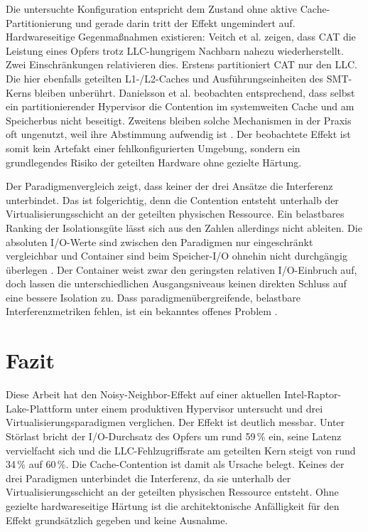 \documentclass[conference]{IEEEtran}
\begin{document}
Die untersuchte Konfiguration entspricht dem Zustand ohne aktive Cache-Partitionierung und gerade darin tritt der Effekt ungemindert auf. Hardwareseitige Gegenmaßnahmen existieren: Veitch et al. \cite{veitch2017performance} zeigen, dass CAT die Leistung eines Opfers trotz LLC-hungrigem Nachbarn nahezu wiederherstellt. Zwei Einschränkungen relativieren dies. Erstens partitioniert CAT nur den LLC. Die hier ebenfalls geteilten L1-/L2-Caches und Ausführungseinheiten des SMT-Kerns bleiben unberührt. Danielsson et al. \cite{danielsson2019testing} beobachten entsprechend, dass selbst ein partitionierender Hypervisor die Contention im systemweiten Cache und am Speicherbus nicht beseitigt. Zweitens bleiben solche Mechanismen in der Praxis oft ungenutzt, weil ihre Abstimmung aufwendig ist \cite{larsson2025esther}. Der beobachtete Effekt ist somit kein Artefakt einer fehlkonfigurierten Umgebung, sondern ein grundlegendes Risiko der geteilten Hardware ohne gezielte Härtung.

Der Paradigmenvergleich zeigt, dass keiner der drei Ansätze die Interferenz unterbindet. Das ist folgerichtig, denn die Contention entsteht unterhalb der Virtualisierungsschicht an der geteilten physischen Ressource. Ein belastbares Ranking der Isolationsgüte lässt sich aus den Zahlen allerdings nicht ableiten. Die absoluten I/O-Werte sind zwischen den Paradigmen nur eingeschränkt vergleichbar und Container sind beim Speicher-I/O ohnehin nicht durchgängig überlegen \cite{li2017performance}. Der Container weist zwar den geringsten relativen I/O-Einbruch auf, doch lassen die unterschiedlichen Ausgangsniveaus keinen direkten Schluss auf eine bessere Isolation zu. Dass paradigmenübergreifende, belastbare Interferenzmetriken fehlen, ist ein bekanntes offenes Problem \cite{gajanin2025performance}.

\section{Fazit}
Diese Arbeit hat den Noisy-Neighbor-Effekt auf einer aktuellen Intel-Raptor-Lake-Plattform unter einem produktiven Hypervisor untersucht und drei Virtualisierungsparadigmen verglichen. Der Effekt ist deutlich messbar. Unter Störlast bricht der I/O-Durchsatz des Opfers um rund 59\,\% ein, seine Latenz vervielfacht sich und die LLC-Fehlzugriffsrate am geteilten Kern steigt von rund 34\,\% auf 60\,\%. Die Cache-Contention ist damit als Ursache belegt. Keines der drei Paradigmen unterbindet die Interferenz, da sie unterhalb der Virtualisierungsschicht an der geteilten physischen Ressource entsteht. Ohne gezielte hardwareseitige Härtung ist die architektonische Anfälligkeit für den Effekt grundsätzlich gegeben und keine Ausnahme.
\end{document}
